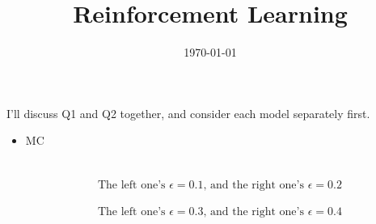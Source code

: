 \documentclass[a4paper]{article}
\date{\today}
\title{Reinforcement Learning}
\begin{document}
    \header

	\begin{answer}
		I'll discuss Q1 and Q2 together, and consider each model separately first.
		\begin{itemize}
			\item MC\\
				\\
				\\
				\[\text{The left one's $\epsilon = 0.1$, and the right one's $\epsilon = 0.2$} \]
				\\
				\[\text{The left one's $\epsilon = 0.3$, and the right one's $\epsilon = 0.4$} \]


\end{itemize}
\end{answer}
\end{document}
